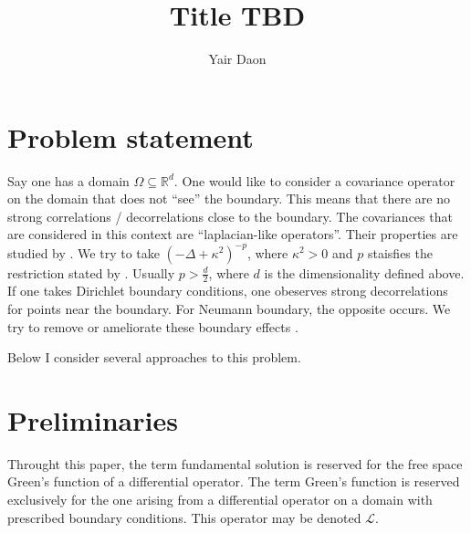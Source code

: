 \documentclass[paper=a4, fontsize=11pt]{scrartcl} %
\title{Title TBD}
\author{Yair Daon}
\date{}
\numberwithin{equation}{section} %
\numberwithin{figure}{section} %
\numberwithin{table}{section} %
\newcommand{\Op}{\mathcal{L}}
\begin{document}
\maketitle
\begin{abstract}
\end{abstract}

\section{Problem statement}
Say one has a domain $\Omega \subseteq \mathbb{R}^d$. One would like to consider a covariance operator on the domain 
that does not ``see'' the boundary. This means that there are no strong correlations / decorrelations close to
the boundary. The covariances that are considered in this context are ``laplacian-like operators''. Their properties
are studied by \cite{stuart2010inverse}.
We try to take $(-\Delta + \kappa^2 )^{-p}$, where $\kappa^2 > 0$
and $p$ staisfies the restriction stated by \cite{stuart2010inverse}. Usually $p > \frac{d}{2}$,
where $d$ is the dimensionality defined above. If one takes Dirichlet boundary conditions, one obeserves 
strong decorrelations for points near the boundary. For Neumann boundary, the opposite occurs. We try 
to remove or ameliorate these boundary effects \cite{bui2013computational}.

Below I consider several approaches to this problem.

\section{Preliminaries}

Throught this paper, the term fundamental solution is reserved for the free space Green's 
function of a differential operator. The term Green's function 
is reserved exclusively for the one arising from a differential
operator on a domain with prescribed boundary conditions. This operator
may be denoted $\Op$.

\end{document}
